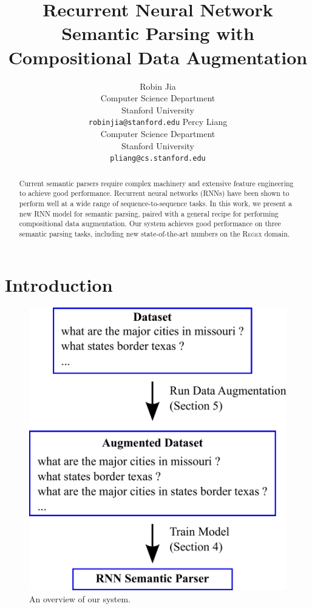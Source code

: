 \documentclass[11pt,letterpaper]{article}
\title{Recurrent Neural Network Semantic Parsing
with Compositional Data Augmentation}
\author{Robin Jia\\
	    Computer Science Department\\
      Stanford University\\
	    {\tt robinjia@stanford.edu}
	  \And
    Percy Liang\\
    Computer Science Department\\
  	Stanford University\\
  {\tt pliang@cs.stanford.edu}}
\date{}
\newcommand{\regex}{\textsc{Regex}\xspace}
\begin{document}
\maketitle

\begin{abstract}
Current semantic parsers require complex machinery and
extensive feature engineering to achieve good performance.
Recurrent neural networks (RNNs)
have been shown to perform well at a wide range of sequence-to-sequence tasks.
In this work, we present a new RNN model for semantic parsing, paired with a general
recipe for performing compositional data augmentation.
Our system achieves good performance on three semantic parsing tasks,
including new state-of-the-art numbers on the \regex domain.
\end{abstract}

\section{Introduction}
\begin{figure}[t] 
\begin{center} 
  \includegraphics[scale=0.4]{fig-overview.pdf}
\end{center} 
\caption{An overview of our system.}
\label{fig:overview}
\end{figure}
\end{document}
